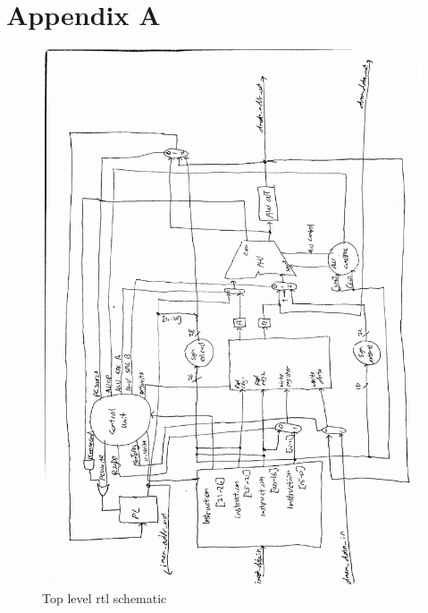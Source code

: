 \section{Appendix A}

\begin{figure}[ht!]
    \begin{center}
    \includegraphics[width=\textwidth]{assets/top_level_rtl.pdf}
    \caption{Top level rtl schematic}
    \label{fig:top_level_rtl}
    \end{center}
\end{figure}
